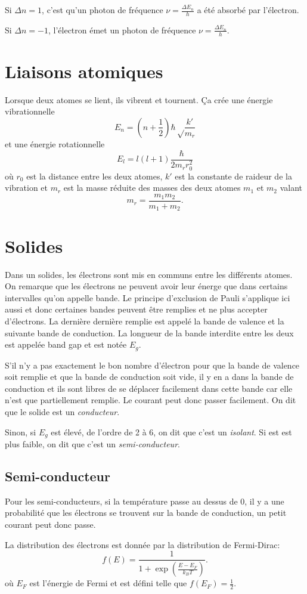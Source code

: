 Si $\Delta n = 1$, c'est qu'un photon de fréquence
$\nu = \frac{\Delta E_n}{h}$ a été absorbé par l'électron.

Si $\Delta n = -1$, l'électron émet un photon de fréquence
$\nu = \frac{\Delta E_n}{h}$.

\section{Liaisons atomiques}
Lorsque deux atomes se lient,
ils vibrent et tournent.
Ça crée une énergie vibrationnelle
\[ E_n = \left(n + \frac{1}{2}\right)\hbar\sqrt\frac{k'}{m_r} \]
et une énergie rotationnelle
\[ E_l = l(l+1) \frac{\hbar}{2m_rr_0^2} \]
où $r_0$ est la distance entre les deux atomes,
$k'$ est la constante de raideur de la vibration et
$m_r$ est la masse réduite des masses des deux atomes $m_1$ et $m_2$ valant
\[ m_r = \frac{m_1m_2}{m_1+m_2}. \]

\section{Solides}
Dans un solides,
les électrons sont mis en communs entre les différents atomes.
On remarque que les électrons ne peuvent avoir leur énerge que dans certains
intervalles qu'on appelle bande.
Le principe d'exclusion de Pauli s'applique ici aussi et donc certaines
bandes peuvent être remplies et ne plus accepter d'électrons.
La dernière dernière remplie est appelé la bande de valence et la suivante
bande de conduction.
La longueur de la bande interdite entre les deux est appelée
band gap et est notée $E_g$.

S'il n'y a pas exactement le bon nombre d'électron pour
que la bande de valence soit remplie et que la bande de conduction soit
vide, il y en a dans la bande de conduction et ils sont libres de se
déplacer facilement dans cette bande car elle n'est que partiellement remplie.
Le courant peut donc passer facilement.
On dit que le solide est un \emph{conducteur}.

Sinon, si $E_g$ est élevé, de l'ordre de 2 à \si{6}{\electronvolt},
on dit que c'est un \emph{isolant}.
Si est est plus faible, on dit que c'est un \emph{semi-conducteur}.

\subsection{Semi-conducteur}
Pour les semi-conducteurs,
si la température passe au dessus de \si{0}{\kelvin},
il y a une probabilité que les électrons
se trouvent sur la bande de conduction,
un petit courant peut donc passe.

La distribution des électrons est donnée par la distribution de Fermi-Dirac:
\[ f(E) = \frac{1}{1+\exp\left(\frac{E-E_F}{k_BT}\right)}. \]
où $E_F$ est l'énergie de Fermi et est défini telle que
$f(E_F) = \frac{1}{2}$.


